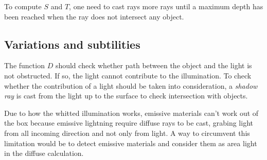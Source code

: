 To compute \(S\) and \(T\), one need to cast rays more rays until a maximum depth has been reached when the ray does not intersect any object.

\subsection{Variations and subtilities}
The function \(D\) should check whether path between the object and the light is not obstructed. If so, the light cannot contribute to the illumination.
To check whether the contribution of a light should be taken into consideration, a \textit{shadow ray} is cast from the light up to the surface to check intersection with objects.

Due to how the whitted illumination works, emissive materials can't work out of the box because emissive lightning require diffuse rays to be cast, grabing light from all incoming direction  and not only from light.
A way to circumvent this limitation would be to detect emissive materials and consider them as area light in the diffuse calculation.